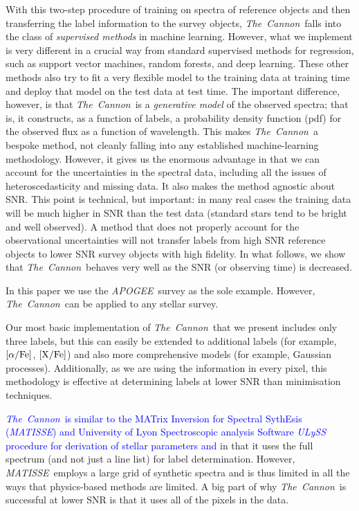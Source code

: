 \documentclass[12pt, preprint]{aastex}
\newcommand{\tc}{\textsl{The~Cannon}}
\newcommand{\apogee}{\textsl{APOGEE}}
\newcommand{\matisse}{\textsl{MATISSE}}
\newcommand{\xfe}{\mbox{$\rm [X/Fe]$}}
\newcommand{\alphafe}{\mbox{$\rm [\alpha/Fe]$}}
\begin{document}
With this two-step procedure of training on spectra of reference objects and then transferring the label information to the survey objects, \tc\ falls into the class of \emph{supervised methods} in machine learning. 
However, what we implement is very different in a crucial way from standard supervised methods for regression, such as support vector machines, random forests, and deep learning.
These other methods also try to fit a very flexible model to the training data at training time
and deploy that model on the test data at test time.
The important difference, however, is that \tc\ is a \emph{generative model} of the observed spectra;
that is, it constructs, as a function of labels, a probability density function (pdf) for the observed
flux as a function of wavelength. 
This makes \tc\ a bespoke method, not cleanly falling into any established machine-learning methodology.
However, it gives us the enormous advantage in that we can account for the uncertainties in the spectral data,
including all the issues of heteroscedasticity and missing data.
It also makes the method agnostic about SNR.
This point is technical, but important: in many real cases the training data will be much higher in SNR than the test data
(standard stars tend to be bright and well observed).
A method that does not properly account for the observational uncertainties will not transfer labels from high SNR reference objects to lower SNR survey objects with high fidelity.
In what follows, we show that \tc\ behaves very well as the SNR (or observing time) is decreased.

In this paper we use the \apogee\ survey as the sole example. 
However, \tc\ can be applied to any stellar survey.  

Our most basic implementation of \tc\ that we present includes only three labels, but this can easily be extended to additional labels  (for example, \alphafe, \xfe) and also more comprehensive models (for example, Gaussian processes). 
Additionally, as we are using the information in every pixel, this methodology is effective at determining labels at lower SNR than minimisation techniques.

\textcolor{blue}{ \tc\ is similar to the MATrix Inversion for Spectral SythEsis (\matisse) and  University of Lyon Spectroscopic analysis Software \textit{ULySS} procedure
for derivation of stellar parameters \citep{RB2006} and \citep{Koleva2009}} in that it uses the full spectrum
(and not just a line list) for label determination.
However, \matisse\ employs a large grid of synthetic spectra
and is thus limited in all the ways that physics-based methods are limited.
A big part of why \tc\ is successful at lower SNR
is that it uses all of the pixels in the data.
\end{document}

